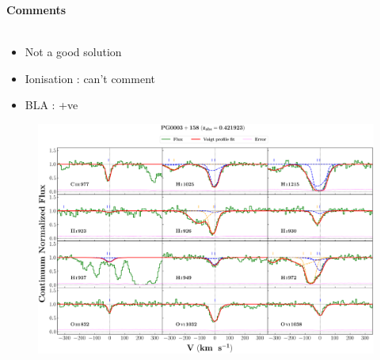 \documentclass[12pt,draft]{report}
\begin{document}
\newpage

\textbf{Comments}
\\\\
\begin{itemize}
    \item Not a good solution
    \item Ionisation : can't comment
    \item BLA : +ve
\end{itemize}



\newpage


\begin{landscape}

    \begin{figure}
    \centering
    \vspace{-20mm}
    \hspace*{-35mm}
    \includegraphics[width=1.25\linewidth]{System-Plots/PG0003+158_z=0.421923_sys_plot.png}
    \end{figure}
    
\end{landscape}
\end{document}
